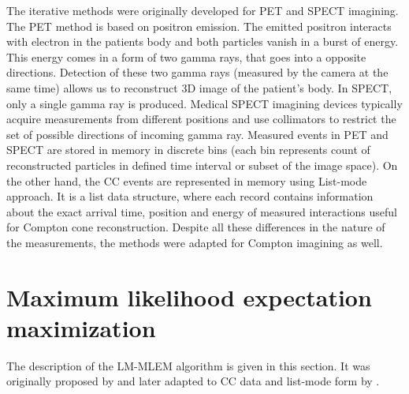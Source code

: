 The iterative methods were originally developed for \ac{PET} and \ac{SPECT} imagining.
The \ac{PET}  method is based on positron emission. 
The emitted positron interacts with electron in the patients body and both particles vanish in a burst of energy. 
This energy comes in a form of two gamma rays, that goes into a opposite directions.
Detection of these two gamma rays (measured by the camera at the same time) allows us to reconstruct 3D image of the patient's body.
In \ac{SPECT}, only a single gamma ray is produced. 
Medical \ac{SPECT} imagining devices typically acquire measurements from different positions and use collimators to restrict the set of possible directions of incoming gamma ray.
Measured events in \ac{PET} and \ac{SPECT} are stored in memory in discrete bins (each bin represents count of reconstructed particles in defined time interval or subset of the image space).
On the other hand, the \ac{CC} events are represented in memory using List-mode approach.
It is a list data structure, where each record contains information about the exact arrival time, position and energy of measured interactions useful for Compton cone reconstruction.
Despite all these differences in the nature of the measurements, the methods were adapted for Compton imagining as well.


\section{Maximum likelihood expectation maximization}
The description of the \ac{LM-MLEM} algorithm is given in this section.
It was originally proposed by \cite{1982_shepp_vardi_MLEM} and later adapted to \ac{CC} data and list-mode form by \cite{wilderman}.

